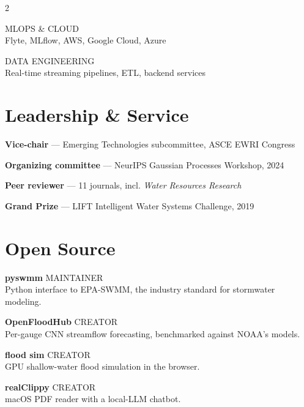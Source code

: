 \documentclass{article}
\newcommand{\skillgroup}[2]{
  {\metafont\footnotesize\textcolor{cardinal}{#1}}\\
  {\small #2}
  \vspace{0.3em}
}
\newcommand{\serviceitem}[2]{
  {\small\textbf{#1} — #2}
  \vspace{0.25em}
}
\begin{document}
\begin{paracol}{2}
\begin{flushleft}
\skillgroup{MLOPS \& CLOUD}{Flyte, MLflow, AWS, Google Cloud, Azure}

\skillgroup{DATA ENGINEERING}{Real-time streaming pipelines, ETL, backend services}

\section{Leadership \& Service}
\vspace{0.3em}
\serviceitem{Vice-chair}{Emerging Technologies subcommittee, ASCE EWRI Congress}

\serviceitem{Organizing committee}{NeurIPS Gaussian Processes Workshop, 2024}

\serviceitem{Peer reviewer}{11 journals, incl. \textit{Water Resources Research}}

\serviceitem{Grand Prize}{LIFT Intelligent Water Systems Challenge, 2019}

\section{Open Source}
\vspace{0.3em}
\textbf{pyswmm} \hfill {\metafont\footnotesize\textcolor{slate}{MAINTAINER}}\\
{\small Python interface to EPA-SWMM, the industry standard for stormwater modeling.}
\vspace{0.25em}

\textbf{OpenFloodHub} \hfill {\metafont\footnotesize\textcolor{slate}{CREATOR}}\\
{\small Per-gauge CNN streamflow forecasting, benchmarked against NOAA's models.}
\vspace{0.25em}

\textbf{flood sim} \hfill {\metafont\footnotesize\textcolor{slate}{CREATOR}}\\
{\small GPU shallow-water flood simulation in the browser.}
\vspace{0.25em}

\textbf{realClippy} \hfill {\metafont\footnotesize\textcolor{slate}{CREATOR}}\\
{\small macOS PDF reader with a local-LLM chatbot.}

\end{flushleft}
\end{paracol}
\end{document}
